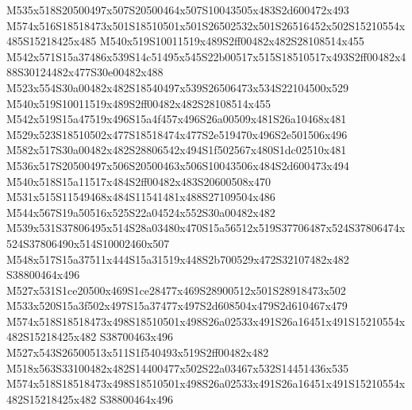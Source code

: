 \documentclass{article}
\begin{document}
\begin{multicols}{2}










M535x518S20500497x507S20500464x507S10043505x483S2d600472x493 M574x516S18518473x501S18510501x501S26502532x501S26516452x502S15210554x485S15218425x485 M540x519S10011519x489S2ff00482x482S28108514x455 M542x571S15a37486x539S14c51495x545S22b00517x515S18510517x493S2ff00482x488S30124482x477S30e00482x488 M523x554S30a00482x482S18540497x539S26506473x534S22104500x529 M540x519S10011519x489S2ff00482x482S28108514x455 M542x519S15a47519x496S15a4f457x496S26a00509x481S26a10468x481 M529x523S18510502x477S18518474x477S2e519470x496S2e501506x496 M582x517S30a00482x482S28806542x494S1f502567x480S1dc02510x481 M536x517S20500497x506S20500463x506S10043506x484S2d600473x494 M540x518S15a11517x484S2ff00482x483S20600508x470 M531x515S11549468x484S11541481x488S27109504x486 M544x567S19a50516x525S22a04524x552S30a00482x482 M539x531S37806495x514S28a03480x470S15a56512x519S37706487x524S37806474x524S37806490x514S10002460x507 M548x517S15a37511x444S15a31519x448S2b700529x472S32107482x482 S38800464x496 M527x531S1ce20500x469S1ce28477x469S28900512x501S28918473x502 M533x520S15a3f502x497S15a37477x497S2d608504x479S2d610467x479 M574x518S18518473x498S18510501x498S26a02533x491S26a16451x491S15210554x482S15218425x482 S38700463x496 M527x543S26500513x511S1f540493x519S2ff00482x482 M518x563S33100482x482S14400477x502S22a03467x532S14451436x535 M574x518S18518473x498S18510501x498S26a02533x491S26a16451x491S15210554x482S15218425x482 S38800464x496


\end{multicols}
\end{document}
